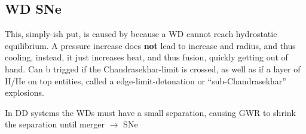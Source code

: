\documentclass{article}
\begin{document}
\subsection{WD SNe}\label{WD-SNe}
\begin{list}{-}{}
\item This, simply-ish put, is caused by because a WD cannot reach hydrostatic equilibrium. A pressure increase does \textbf{not} lead to increase and radius, and thus cooling, instead, it just increases heat, and thus fusion, quickly getting out of hand. Can b trigged if the \gls{Chandrasekhar-limit} is crossed, as well as if a layer of H/He on top entities, called a \gls{edge-limit-detonation} or ``sub-Chandrasekhar'' explosions.
\item In \gls{DD} systems the WDs must have a small separation, causing \gls{GWR} to shrink the separation until merger \(\rightarrow\) SNe
\end{list}
\clearpage

\printglossaries
\end{document}
